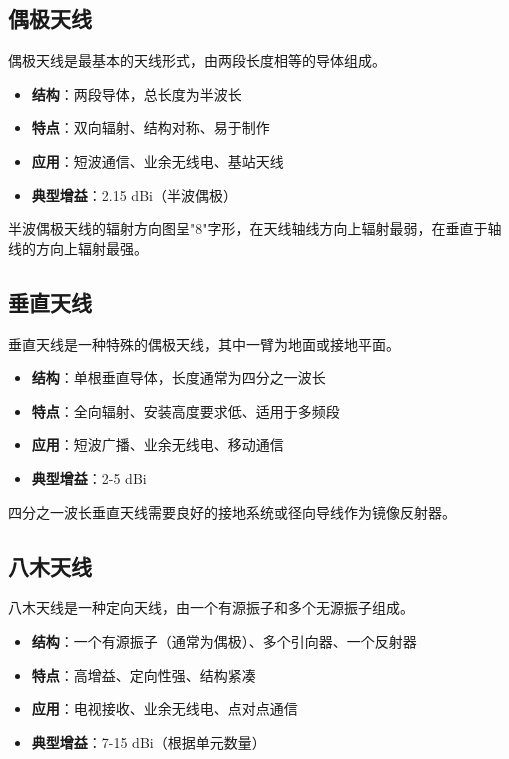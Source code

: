 \subsection{偶极天线}
\label{sec:dipole_antenna}

偶极天线是最基本的天线形式，由两段长度相等的导体组成。

\begin{itemize}
    \item \textbf{结构}：两段导体，总长度为半波长
    \item \textbf{特点}：双向辐射、结构对称、易于制作
    \item \textbf{应用}：短波通信、业余无线电、基站天线
    \item \textbf{典型增益}：2.15 dBi（半波偶极）
\end{itemize}

半波偶极天线的辐射方向图呈"8"字形，在天线轴线方向上辐射最弱，在垂直于轴线的方向上辐射最强。

\subsection{垂直天线}
\label{sec:vertical_antenna}

垂直天线是一种特殊的偶极天线，其中一臂为地面或接地平面。

\begin{itemize}
    \item \textbf{结构}：单根垂直导体，长度通常为四分之一波长
    \item \textbf{特点}：全向辐射、安装高度要求低、适用于多频段
    \item \textbf{应用}：短波广播、业余无线电、移动通信
    \item \textbf{典型增益}：2-5 dBi
\end{itemize}

四分之一波长垂直天线需要良好的接地系统或径向导线作为镜像反射器。

\subsection{八木天线}
\label{sec:yagi_antenna}

八木天线是一种定向天线，由一个有源振子和多个无源振子组成。

\begin{itemize}
    \item \textbf{结构}：一个有源振子（通常为偶极）、多个引向器、一个反射器
    \item \textbf{特点}：高增益、定向性强、结构紧凑
    \item \textbf{应用}：电视接收、业余无线电、点对点通信
    \item \textbf{典型增益}：7-15 dBi（根据单元数量）
\end{itemize}

